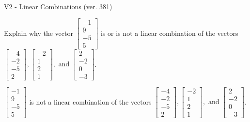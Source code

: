 \begin{exercise}
  \begin{exerciseTitle}V2 - Linear Combinations (ver. 381)\end{exerciseTitle}
  \begin{exerciseStatement}
    Explain why the vector \(\left[\begin{array}{c}
-1 \\
9 \\
-5 \\
5
\end{array}\right]\)  is or is not a linear 
	combination of the vectors \(\left[\begin{array}{c}
-4 \\
-2 \\
-5 \\
2
\end{array}\right] , \left[\begin{array}{c}
-2 \\
1 \\
2 \\
1
\end{array}\right] , \text{ and } \left[\begin{array}{c}
2 \\
-2 \\
0 \\
-3
\end{array}\right]\).
	


  \end{exerciseStatement}
  \begin{exerciseAnswer}
   \(\left[\begin{array}{c}
-1 \\
9 \\
-5 \\
5
\end{array}\right]\) 
  	 is not  
	a linear combination of the vectors \(\left[\begin{array}{c}
-4 \\
-2 \\
-5 \\
2
\end{array}\right] , \left[\begin{array}{c}
-2 \\
1 \\
2 \\
1
\end{array}\right] , \text{ and } \left[\begin{array}{c}
2 \\
-2 \\
0 \\
-3
\end{array}\right]\).

	
  


  \end{exerciseAnswer}
\end{exercise}